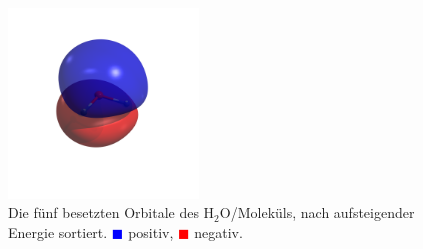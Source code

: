 \begin{enumerate}
\begin{figure}[H]
\includegraphics[trim=700 800 700 600, clip, width=0.45\textwidth]{res/H2O/h2o_w4.png}
\caption{Die fünf besetzten Orbitale des H$_2$O\-/Moleküls,
nach aufsteigender Energie sortiert.
\textcolor{blue}{$\blacksquare$} positiv,
\textcolor{red}{$\blacksquare$} negativ.}\label{h2o_orbitals}
\end{figure}


\end{enumerate}
